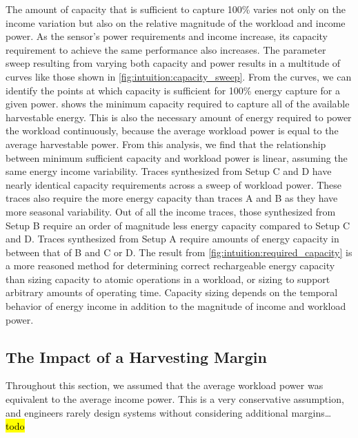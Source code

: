 The amount of capacity that is sufficient to capture 100\% varies not only on the income variation but also on the relative magnitude of the workload and income power.
As the sensor's power requirements and income increase, its capacity requirement to achieve the same performance also increases. 
The parameter sweep resulting from varying both capacity and power results in a multitude of curves like those shown in \cref{fig:intuition:capacity_sweep}. 
From the curves, we can identify the points at which capacity is sufficient for 100\% energy capture for a given power.  shows the minimum capacity required to capture all of the available harvestable energy. This is also the necessary amount of energy required to power the workload continuously, because the average workload power is equal to the average harvestable power. 
From this analysis, we find that the relationship between minimum sufficient capacity and workload power is linear, assuming the same energy income variability. 
Traces synthesized from Setup C and D have nearly identical capacity requirements across a sweep of workload power. These traces also require the more energy capacity than traces A and B as they have more seasonal variability. 
Out of all the income traces, those synthesized from Setup B require an order of magnitude less energy capacity compared to Setup C and D. 
Traces synthesized from Setup A require amounts of energy capacity in between that of B and C or D.
The result from \cref{fig:intuition:required_capacity} is a more reasoned method for determining correct rechargeable energy capacity than sizing capacity to atomic operations in a workload, or sizing to support arbitrary amounts of operating time.
Capacity sizing depends on the temporal behavior of energy income in addition to the magnitude of income and workload power. 

\subsection{The Impact of a Harvesting Margin}
Throughout this section, we assumed that the average workload power was equivalent to the average income power. This is a very conservative assumption, and engineers rarely design systems without considering additional margins\dots
\hl{todo}

